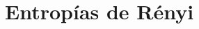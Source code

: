 \documentclass[../main.tex]{subfiles}
\begin{document}
\setcounter{chapter}{3}
\chapter{Entropías de Rényi}
\end{document}
